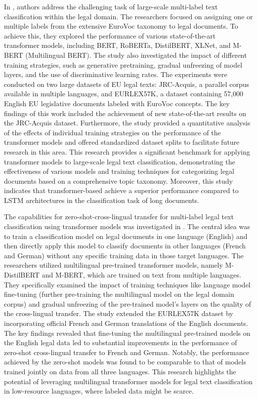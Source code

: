 \documentclass[onecolumn, journal, english, 12pt, a4paper]{IEEEtran} %
\theoremstyle{definition}
\begin{document}
In \cite{Shaheen2020}, authors address the challenging task of
large-scale multi-label text classification within the legal
domain. The researchers focused on assigning one or multiple labels
from the extensive EuroVoc taxonomy to legal documents. To achieve
this, they explored the performance of various state-of-the-art
transformer models, including BERT, RoBERTa, DistilBERT, XLNet, and
M-BERT (Multilingual BERT). The study also investigated the impact of
different training strategies, such as generative pretraining, gradual
unfreezing of model layers, and the use of discriminative learning
rates. The experiments were conducted on two large datasets of EU
legal texts: JRC-Acquis, a parallel corpus available in multiple
languages, and EURLEX57K, a dataset containing 57,000 English EU
legislative documents labeled with EuroVoc concepts. The key findings
of this work included the achievement of new state-of-the-art results
on the JRC-Acquis dataset. Furthermore, the study provided a
quantitative analysis of the effects of individual training strategies
on the performance of the transformer models and offered standardized
dataset splits to facilitate future research in this area. This
research provides a significant benchmark for applying transformer
models to large-scale legal text classification, demonstrating the
effectiveness of various models and training techniques for
categorizing legal documents based on a comprehensive topic
taxonomy. Moreover, this study indicates that transformer-based
achieve a superior performance compared to LSTM architectures in the
classification task of long documents. 

The capabilities for zero-shot-cross-lingual transfer for multi-label
legal text classification using transformer models was investigated in
\cite{Shaheen2021}. The central idea was to train a classification
model on legal documents in one language (English) and then directly
apply this model to classify documents in other languages (French and
German) without any specific training data in those target
languages. The researchers utilized multilingual pre-trained
transformer models, namely M-DistilBERT and M-BERT, which are trained
on text from multiple languages. They specifically examined the impact
of training techniques like language model fine-tuning (further
pre-training the multilingual model on the legal domain corpus) and
gradual unfreezing of the pre-trained model's layers on the quality of
the cross-lingual transfer. The study extended the EURLEX57K dataset
by incorporating official French and German translations of the
English documents. The key findings revealed that fine-tuning the
multilingual pre-trained models on the English legal data led to
substantial improvements in the performance of zero-shot cross-lingual
transfer to French and German. Notably, the performance achieved by
the zero-shot models was found to be comparable to that of models
trained jointly on data from all three languages. This research
highlights the potential of leveraging multilingual transformer models
for legal text classification in low-resource languages, where labeled
data might be scarce.
\end{document}
